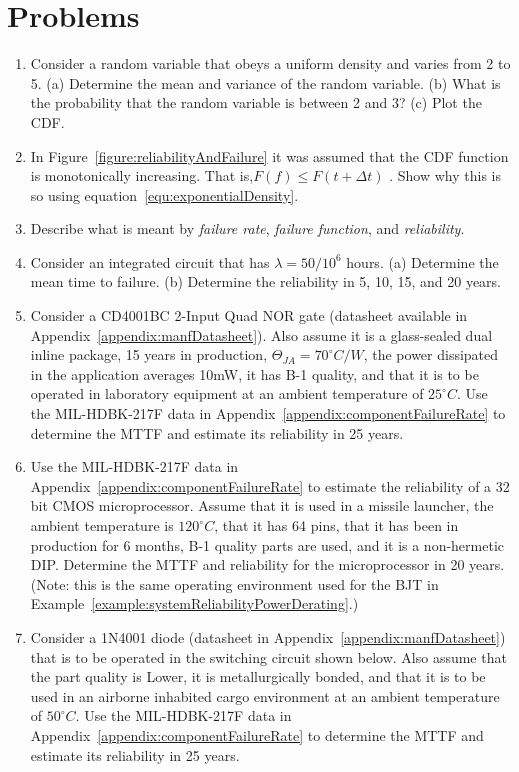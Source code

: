 \section{Problems}
\label{section:problems}

\begin{enumerate}
\def\labelenumi{\arabic{enumi}.}
\item
  Consider a random variable that obeys a uniform density and varies
  from 2 to 5. (a) Determine the mean and variance of the random
  variable. (b) What is the probability that the random variable is
  between 2 and 3? (c) Plot the CDF.

\item
  In Figure~\ref{figure:reliabilityAndFailure}
  it was assumed that the CDF function is monotonically
  increasing. That is,$F(f) \leq F(t+\Delta t)$ . Show why this is so using 
  equation~\ref{equ:exponentialDensity}.

\item
  Describe what is meant by \emph{failure rate}, \emph{failure
  function}, and \emph{reliability}.
\item
  Consider an integrated circuit that has $\lambda=50/10^6$ hours. 
  (a) Determine the mean time
  to failure. (b) Determine the reliability in 5, 10, 15, and 20 years.

\item
  Consider a CD4001BC 2-Input Quad NOR gate (datasheet available in
  Appendix~\ref{appendix:manfDatasheet}). Also assume it is a 
  glass-sealed dual inline package, 15
  years in production, $\Theta_{JA} = 70^\circ C/W$, the
  power dissipated in the application averages 10mW, it has B-1 quality,
  and that it is to be operated in laboratory equipment at an ambient
  temperature of $25^\circ C$. Use the MIL-HDBK-217F data in 
  Appendix~\ref{appendix:componentFailureRate} to
  determine the MTTF and estimate its reliability in 25 years.

\item
  Use the MIL-HDBK-217F data in 
  Appendix~\ref{appendix:componentFailureRate} to estimate the reliability
  of a 32 bit CMOS microprocessor. Assume that it is used in a missile
  launcher, the ambient temperature is $120^\circ C$, that it has 64 pins, that
  it has been in production for 6 months, B-1 quality parts are used,
  and it is a non-hermetic DIP. Determine the MTTF and reliability for
  the microprocessor in 20 years. (Note: this is the same operating
  environment used for the BJT in 
  Example~\ref{example:systemReliabilityPowerDerating}.)
\item
  Consider a 1N4001 diode (datasheet in 
  Appendix~\ref{appendix:manfDatasheet}) that is to be
  operated in the switching circuit shown below. Also assume that the
  part quality is Lower, it is metallurgically bonded, and that it is to
  be used in an airborne inhabited cargo environment at an ambient
  temperature of $50^\circ C$. Use the MIL-HDBK-217F data in 
  Appendix~\ref{appendix:componentFailureRate} to
  determine the MTTF and estimate its reliability in 25 years.


\end{enumerate}
